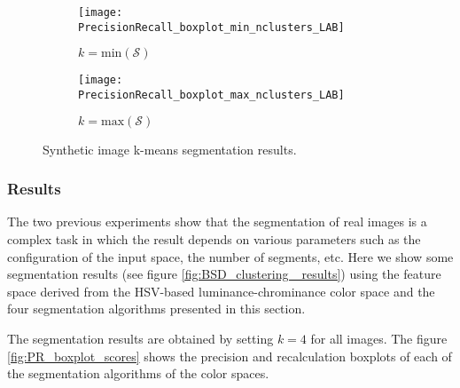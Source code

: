 \begin{figure}[!ht]
    \centering
    \begin{subfigure}[b]{0.3\textwidth}
        \texttt{[image: PrecisionRecall\_boxplot\_min\_nclusters\_LAB]}
        \caption{$k=\mathrm{min}(\mathcal{S})$}
    \end{subfigure}     
    \begin{subfigure}[b]{0.3\textwidth}
    	\centering
    	\texttt{[image: PrecisionRecall\_boxplot\_max\_nclusters\_LAB]}
        \caption{$k=\mathrm{max}(\mathcal{S})$}
    \end{subfigure}     
    
        	    
    \caption{Synthetic image k-means segmentation results.}\label{fig:PR_boxplot_scores_min_max_clusters}    
\end{figure}





\subsubsection{Results}
The two previous experiments show that the segmentation of real images is a complex task in which the result depends on various parameters such as the configuration of the input space, the number of segments, etc. Here we show some segmentation results (see figure \ref{fig:BSD_clustering _results}) using the feature space derived from the HSV-based luminance-chrominance color space and the four segmentation algorithms presented in this section.

The segmentation results are obtained by setting $k = 4$ for all images. The figure \ref{fig:PR_boxplot_scores} shows the precision and recalculation boxplots of each of the segmentation algorithms of the color spaces.

